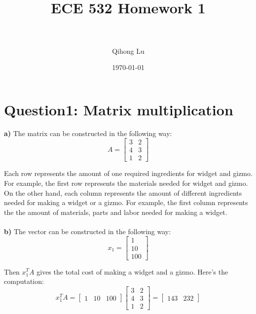 \documentclass[paper=a4, fontsize=11pt]{scrartcl} %
\title{	
\normalfont \normalsize 
\horrule{0.5pt} \\[0.4cm] %
\huge ECE 532 Homework 1 \\ %
\horrule{2pt} \\[0.5cm] %
}
\author{Qihong Lu} %
\date{\normalsize\today} %
\numberwithin{equation}{section} %
\numberwithin{figure}{section} %
\numberwithin{table}{section} %
\begin{document}
\maketitle %


\section*{Question1: Matrix multiplication}
\textbf{a)} The matrix can be constructed in the following way: 
\[ 
A=
\left[ \begin{array}{cc}
3 & 2 \\
4 & 3 \\
1 & 2
\end{array} \right]
\]

Each row represents the amount of one required ingredients for widget and gizmo. For example, the first row represents the materials needed for widget and gizmo. \\
On the other hand, each column represents the amount of different ingredients needed for making a widget or a gizmo. For example, the first column represents the the amount of materials, parts and labor needed for making a widget. \\\\

\textbf{b)} The vector can be constructed in the following way: 
\[ 
x_1=
\left[ \begin{array}{c}
1  \\
10 \\
100
\end{array} \right]
\]

Then $x_1^T A$ gives the total cost of making a widget and a gizmo. Here's the computation: 
\[ 
x_1^T A = 
\left[ \begin{array}{ccc}
1 & 10 & 100
\end{array} \right]
%
\left[ \begin{array}{cc}
3 & 2 \\
4 & 3 \\
1 & 2
\end{array} \right]
=
\left[ \begin{array}{cc}
143 & 232
\end{array} \right]
\]\\
\end{document}
